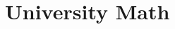 \documentclass[../mathematics_cheat_sheet.tex]{subfiles}
\begin{document}
\part{University Math}






\end{document}
